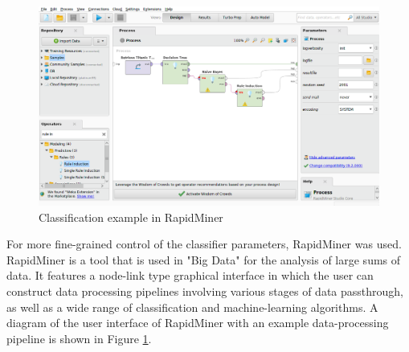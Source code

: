 \begin{figure}[ht]
    \centering
    \includegraphics[width=\textwidth]{04-Methodology/rapidMinerUI.png}
    \caption{Classification example in RapidMiner}
    \label{fig:rapidMinerUi}
\end{figure}
For more fine-grained control of the classifier parameters, RapidMiner was used. RapidMiner is a tool that is used in "Big Data" for the analysis of large sums of data. It features a node-link type graphical interface in which the user can construct data processing pipelines involving various stages of data passthrough, as well as a wide range of classification and machine-learning algorithms. A diagram of the user interface of RapidMiner with an example data-processing pipeline is shown in Figure \ref{fig:rapidMinerUi}.\\


